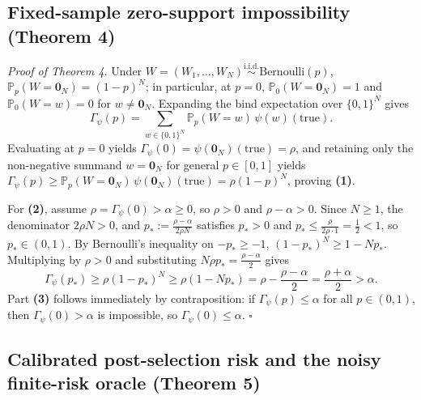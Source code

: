 \documentclass[11pt,a4paper]{article}
\begin{document}
\subsection{Fixed-sample zero-support impossibility (Theorem
4)}\label{fixed-sample-zero-support-impossibility-theorem-4}

\emph{Proof of Theorem 4.} Under
\(W = (W_1, \dots, W_N) \stackrel{\mathrm{i.i.d.}}{\sim} \mathrm{Bernoulli}(p)\),
\(\mathbb{P}_p(W = \mathbf{0}_N) = (1 - p)^N\); in particular, at
\(p = 0\), \(\mathbb{P}_0(W = \mathbf{0}_N) = 1\) and
\(\mathbb{P}_0(W = w) = 0\) for \(w \neq \mathbf{0}_N\). Expanding the
bind expectation over \(\{0,1\}^N\) gives
\[\Gamma_\psi(p) = \sum_{w \in \{0,1\}^N} \mathbb{P}_p(W = w)\, \psi(w)(\mathrm{true}).\]
Evaluating at \(p = 0\) yields
\(\Gamma_\psi(0) = \psi(\mathbf{0}_N)(\mathrm{true}) = \rho\), and
retaining only the non-negative summand \(w = \mathbf{0}_N\) for general
\(p \in [0,1]\) yields
\(\Gamma_\psi(p) \ge \mathbb{P}_p(W = \mathbf{0}_N)\, \psi(\mathbf{0}_N)(\mathrm{true}) = \rho (1 - p)^N\),
proving \textbf{(1)}.

For \textbf{(2)}, assume \(\rho = \Gamma_\psi(0) > \alpha \ge 0\), so
\(\rho > 0\) and \(\rho - \alpha > 0\). Since \(N \ge 1\), the
denominator \(2\rho N > 0\), and
\(p_* := \frac{\rho - \alpha}{2\rho N}\) satisfies \(p_* > 0\) and
\(p_* \le \frac{\rho}{2\rho \cdot 1} = \frac{1}{2} < 1\), so
\(p_* \in (0, 1)\). By Bernoulli's inequality on \(-p_* \ge -1\),
\((1 - p_*)^N \ge 1 - N p_*\). Multiplying by \(\rho > 0\) and
substituting \(N \rho p_* = \frac{\rho - \alpha}{2}\) gives
\[\Gamma_\psi(p_*) \ge \rho (1 - p_*)^N \ge \rho (1 - N p_*) = \rho - \frac{\rho - \alpha}{2} = \frac{\rho + \alpha}{2} > \alpha.\]
Part \textbf{(3)} follows immediately by contraposition: if
\(\Gamma_\psi(p) \le \alpha\) for all \(p \in (0,1)\), then
\(\Gamma_\psi(0) > \alpha\) is impossible, so
\(\Gamma_\psi(0) \le \alpha\). \(\square\)

\subsection{Calibrated post-selection risk and the noisy finite-risk
oracle (Theorem
5)}\label{calibrated-post-selection-risk-and-the-noisy-finite-risk-oracle-theorem-5}
\end{document}
